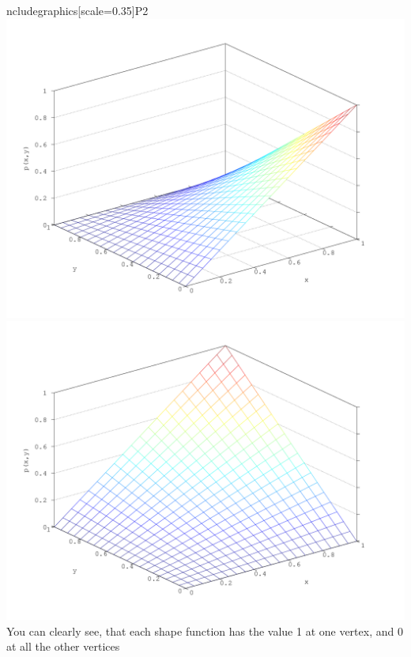 \documentclass[a4paper,12pt]{article}
\begin{document}
ncludegraphics[scale=0.35]{P2} \includegraphics[scale=0.35]{P3} \includegraphics[scale=0.35]{P4}
You can clearly see, that each shape function has the value 1 at one vertex, and 0 at all the other vertices
\end{document}
